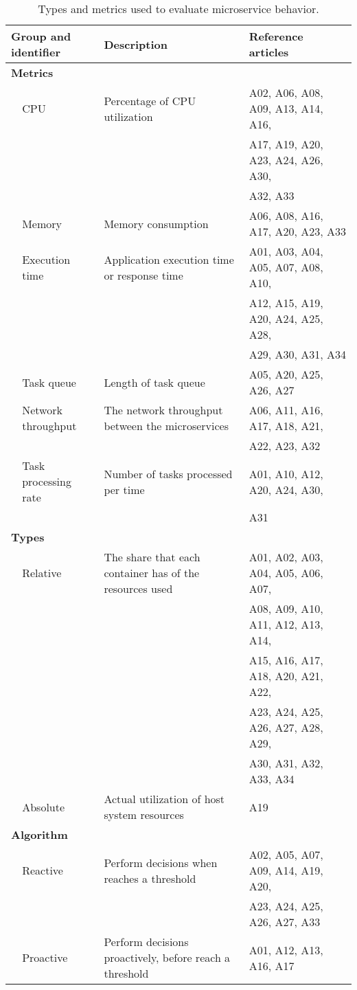 \begin{table*}[p]
\centering
\renewcommand{\arraystretch}{1.5}
\caption{Types and metrics used to evaluate microservice behavior.}
\label{table_SG1}
\begin{tabular}{llll}
\hline
\multicolumn{2}{l}{Group and identifier} & Description & Reference articles \\ \hline

\multicolumn{2}{l}{\textbf{Metrics}} &  &  \\
 & CPU & Percentage of CPU utilization & A02, A06, A08, A09, A13, A14, A16, \\
 &  &  & A17, A19, A20, A23, A24, A26, A30, \\
 &  &  & A32, A33 \\
 & Memory & Memory consumption & A06, A08, A16, A17, A20, A23, A33 \\
 & Execution time & Application execution time or response time & A01, A03, A04, A05, A07, A08, A10, \\
 &  &  & A12, A15, A19, A20, A24, A25, A28, \\
 &  &  & A29, A30, A31, A34 \\
 & Task queue & Length of task queue & A05, A20, A25, A26, A27 \\
 & Network throughput & The network throughput between the microservices & A06, A11, A16, A17, A18, A21,\\
 &  &  & A22, A23, A32 \\
 & Task processing rate & Number of tasks processed per time & A01, A10, A12, A20, A24, A30, \\
 &  &  & A31 \\
 
 \multicolumn{2}{l}{\textbf{Types}} &  &  \\
 & Relative & The share that each container has of the resources used & A01, A02, A03, A04, A05, A06, A07, \\
 &  &  & A08, A09, A10, A11, A12, A13, A14, \\
 &  &  & A15, A16, A17, A18, A20, A21, A22, \\
 &  &  & A23, A24, A25, A26, A27, A28, A29, \\
 &  &  & A30, A31, A32, A33, A34 \\
 & Absolute & Actual utilization of host system resources & A19 \\
 
\multicolumn{2}{l}{\textbf{Algorithm}} &  &  \\
 & Reactive & Perform decisions when reaches a threshold & A02, A05, A07, A09, A14, A19, A20, \\
 &  &  & A23, A24, A25, A26, A27, A33 \\
 & Proactive & Perform decisions proactively, before reach a threshold & A01, A12, A13, A16, A17 \\
 

\end{tabular}
\end{table*}
